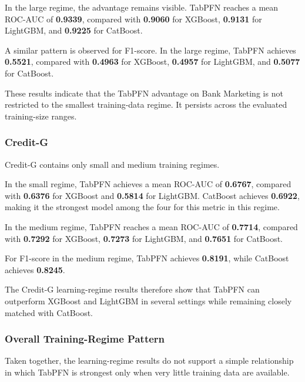 In the large regime, the advantage remains visible. TabPFN reaches a mean ROC-AUC of \textbf{0.9339}, compared with \textbf{0.9060} for XGBoost, \textbf{0.9131} for LightGBM, and \textbf{0.9225} for CatBoost.



A similar pattern is observed for F1-score. In the large regime, TabPFN achieves \textbf{0.5521}, compared with \textbf{0.4963} for XGBoost, \textbf{0.4957} for LightGBM, and \textbf{0.5077} for CatBoost.



These results indicate that the TabPFN advantage on Bank Marketing is not restricted to the smallest training-data regime. It persists across the evaluated training-size ranges.



\subsubsection{Credit-G}



Credit-G contains only small and medium training regimes.



In the small regime, TabPFN achieves a mean ROC-AUC of \textbf{0.6767}, compared with \textbf{0.6376} for XGBoost and \textbf{0.5814} for LightGBM. CatBoost achieves \textbf{0.6922}, making it the strongest model among the four for this metric in this regime.



In the medium regime, TabPFN reaches a mean ROC-AUC of \textbf{0.7714}, compared with \textbf{0.7292} for XGBoost, \textbf{0.7273} for LightGBM, and \textbf{0.7651} for CatBoost.



For F1-score in the medium regime, TabPFN achieves \textbf{0.8191}, while CatBoost achieves \textbf{0.8245}.



The Credit-G learning-regime results therefore show that TabPFN can outperform XGBoost and LightGBM in several settings while remaining closely matched with CatBoost.



\subsubsection{Overall Training-Regime Pattern}



Taken together, the learning-regime results do not support a simple relationship in which TabPFN is strongest only when very little training data are available.



